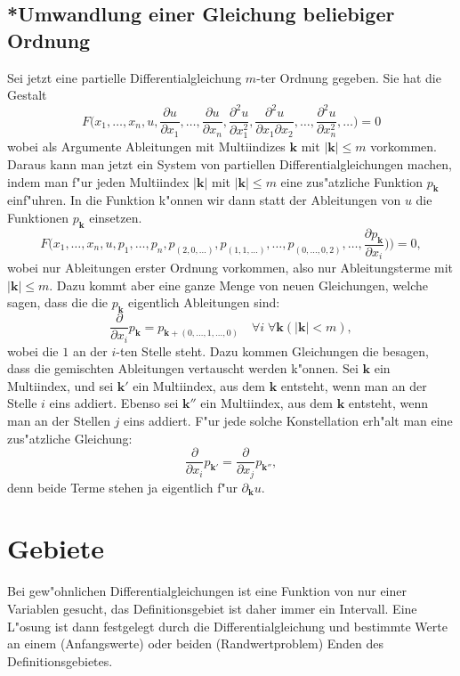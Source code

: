 \subsection{*Umwandlung einer Gleichung beliebiger Ordnung\label{klassifikation:beliebigeordnung}}
Sei jetzt eine partielle Differentialgleichung $m$-ter Ordnung
gegeben. Sie hat die Gestalt
\[
F\bigl(
x_1,\dots,x_n, u, \frac{\partial u}{\partial x_1},\dots,\frac{\partial u}{\partial x_n},\frac{\partial^2u}{\partial x_1^2},\frac{\partial^2 u}{\partial x_1\partial x_2},\dots,\frac{\partial^2u}{\partial x_n^2},\dots
\bigr)=0
\]
wobei als Argumente Ableitungen mit Multiindizes ${\mathbf k}$ mit
$|{\mathbf k}|\le m$ vorkommen. Daraus kann man jetzt ein System von
partiellen Differentialgleichungen machen, indem man f"ur jeden
Multiindex $|{\mathbf k}|$ mit $|{\mathbf k}|\le m$ eine zus"atzliche
Funktion $p_{\mathbf k}$ einf"uhren. In die Funktion k"onnen wir
dann statt der Ableitungen von $u$ die Funktionen $p_{\mathbf k}$
einsetzen.
\[
F\bigl(
x_1,\dots,x_n, u, p_1,\dots,p_n,p_{(2,0,\dots)},p_{(1,1,\dots)},
\dots,p_{(0,\dots,0,2)},\dots, \frac{\partial p_{\mathbf k}}{\partial x_i})
\bigr)=0,
\]
wobei nur Ableitungen erster Ordnung vorkommen, also nur Ableitungsterme
mit $|{\mathbf k}|\le m$.
Dazu kommt aber eine ganze Menge von neuen Gleichungen,
welche sagen, dass die die $p_{\mathbf k}$ eigentlich Ableitungen sind:
\[
\frac{\partial}{\partial x_i}p_{\mathbf k}=p_{{\mathbf k} + (0,\dots,1,\dots,0)}\quad\forall i\;\forall{\mathbf k}(|{\mathbf k}|<m),
\]
wobei die $1$ an der $i$-ten Stelle steht. Dazu kommen Gleichungen
die besagen, dass die gemischten Ableitungen vertauscht werden k"onnen.
Sei ${\mathbf k}$ ein Multiindex, und sei ${\mathbf k}'$ ein Multiindex,
aus dem ${\mathbf k}$ entsteht, wenn man an der Stelle $i$ eins addiert.
Ebenso sei ${\mathbf k}''$ ein Multiindex, aus dem ${\mathbf k}$ entsteht,
wenn man an der Stellen $j$ eins addiert. F"ur jede solche Konstellation
erh"alt man eine zus"atzliche Gleichung:
\[
\frac{\partial}{\partial x_i}p_{{\mathbf k}'}=\frac{\partial}{\partial x_j}p_{{\mathbf k}''},
\]
denn beide Terme stehen ja eigentlich f"ur $\partial_{\mathbf k}u$.
 
\section{Gebiete\label{klassifikation:gebiete}}
Bei gew"ohnlichen Differentialgleichungen ist eine
Funktion von nur einer Variablen gesucht, das Definitionsgebiet ist
daher immer ein Intervall.
Eine L"osung ist dann festgelegt durch die Differentialgleichung
und bestimmte Werte an einem (Anfangswerte) oder beiden (Randwertproblem)
Enden des Definitionsgebietes.

